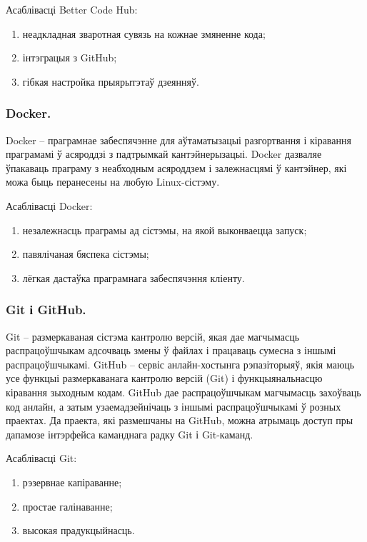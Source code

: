 Асаблівасці Better Code Hub:
\begin{enumerate}
    \item неадкладная зваротная сувязь на кожнае змяненне кода;
    \item інтэграцыя з GitHub;
    \item гібкая настройка прыярытэтаў дзеянняў.
\end{enumerate}

\subsubsection{Docker.}

Docker -- праграмнае забеспячэнне для аўтаматызацыі разгортвання і
кіравання праграмамі ў асяроддзі з падтрымкай кантэйнерызацыі.
Docker дазваляе ўпакаваць праграму з неабходным асяроддзем і
залежнасцямі ў кантэйнер, які можа быць перанесены на любую
Linux-сістэму.

Асаблівасці Docker:
\begin{enumerate}
    \item незалежнасць праграмы ад сістэмы, на якой выконваецца
          запуск;
    \item павялічаная бяспека сістэмы;
    \item лёгкая дастаўка праграмнага забеспячэння кліенту.
\end{enumerate}


\subsubsection{Git і GitHub.}

Git -- размеркаваная сістэма кантролю версій, якая дае магчымасць
распрацоўшчыкам адсочваць змены ў файлах і працаваць сумесна з іншымі
распрацоўшчыкамі.
GitHub -- сервіс анлайн-хостынга рэпазіторыяў, якія маюць усе функцыі
размеркаванага кантролю версій (Git) і функцыянальнасцю кіравання
зыходным кодам. GitHub дае распрацоўшчыкам магчымасць захоўваць
код анлайн, а затым узаемадзейнічаць з іншымі распрацоўшчыкамі ў
розных праектах.
Да праекта, які размешчаны на GitHub, можна атрымаць доступ пры
дапамозе інтэрфейса каманднага радку Git і Git-каманд.

Асаблівасці Git:
\begin{enumerate}
    \item рэзервнае капіраванне;
    \item простае галінаванне;
    \item высокая прадукцыйнасць.
\end{enumerate}
